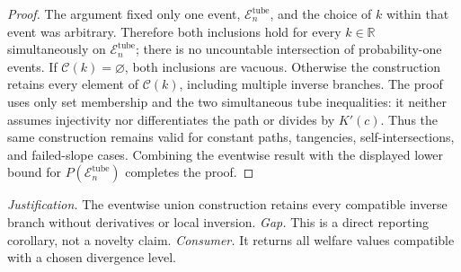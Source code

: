 \documentclass{article}
\begin{document}
\begin{proof}
The argument fixed only one event, \(\mathcal E_n^{\mathrm{tube}}\), and the
choice of \(k\) within that event was arbitrary.  Therefore both inclusions
hold for every \(k\in\mathbb R\) simultaneously on
\(\mathcal E_n^{\mathrm{tube}}\); there is no uncountable intersection of
probability-one events.  If \(\mathcal C(k)=\varnothing\), both inclusions are
vacuous.  Otherwise the construction retains every element of
\(\mathcal C(k)\), including multiple inverse branches.  The proof uses only
set membership and the two simultaneous tube inequalities: it neither assumes
injectivity nor differentiates the path or divides by \(K'(c)\).  Thus the
same construction remains valid for constant paths, tangencies,
self-intersections, and failed-slope cases.  Combining the eventwise result
with the displayed lower bound for \(P(\mathcal E_n^{\mathrm{tube}})\)
completes the proof.
\end{proof}
\par\smallskip\noindent \textit{Justification.} The eventwise union construction retains every compatible inverse branch without derivatives or local inversion. \textit{Gap.} This is a direct reporting corollary, not a novelty claim. \textit{Consumer.} It returns all welfare values compatible with a chosen divergence level.
\end{document}
